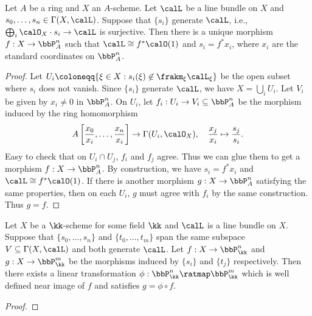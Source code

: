     \begin{theorem}\label{thm:morphism_to_projective_space}
        Let \(A\) be a ring and \(X\) an \(A\)-scheme.
        Let \(\calL\) be a line bundle on \(X\) and \(s_0,\ldots,s_n\in\Gamma(X,\calL)\).
        Suppose that \(\{s_i\}\) generate \(\calL\), i.e., \(\bigoplus_i \calO_X\cdot s_i \to \calL\) is surjective.
        Then there is a unique morphism \(f:X\to \bbP^n_A\) such that \(\calL\cong f^*\calO(1)\) and \(s_i=f^*x_i\), where \(x_i\) are the standard coordinates on \(\bbP^n_A\). 
    \end{theorem}
    \begin{proof}
        Let \(U_i\coloneqq \{\xi \in X: s_i(\xi) \not\in \frakm_\xi \calL_\xi\}\) be the open subset where \(s_i\) does not vanish.
        Since \(\{s_i\}\) generate \(\calL\), we have \(X=\bigcup_i U_i\).
        Let \(V_i\) be given by \(x_i \neq 0\) in \(\bbP^n_A\).
        On \(U_i\), let \(f_i:U_i\to V_i \subseteq \bbP^n_A\) be the morphism induced by the ring homomorphism
        \[ A\left[\frac{x_0}{x_i},\ldots,\frac{x_n}{x_i}\right] \to \Gamma(U_i,\calO_X), \quad \frac{x_j}{x_i} \mapsto \frac{s_j}{s_i}. \]
        Easy to check that on \(U_i\cap U_j\), \(f_i\) and \(f_j\) agree.
        Thus we can glue them to get a morphism \(f:X\to \bbP^n_A\).
        By construction, we have \(s_i=f^*x_i\) and \(\calL\cong f^*\calO(1)\).
        If there is another morphism \(g:X\to \bbP^n_A\) satisfying the same properties, then on each \(U_i\), \(g\) must agree with \(f_i\) by the same construction.
        Thus \(g=f\).
    \end{proof}

    \begin{proposition}\label{prop:different_choices_of_sections_give_different_morphisms_which_differ_by_a_linear_transformation}
        Let \(X\) be a \(\kk\)-scheme for some field \(\kk\) and \(\calL\) is a line bundle on \(X\).
        Suppose that \(\{s_0,\ldots,s_n\}\) and \(\{t_0,\ldots,t_m\}\) span the same subspace \(V\subseteq \Gamma(X,\calL)\) and both generate \(\calL\).
        Let \(f:X\to \bbP^n_\kk\) and \(g:X\to \bbP^m_\kk\) be the morphisms induced by \(\{s_i\}\) and \(\{t_j\}\) respectively.
        Then there exists a linear transformation \(\phi:\bbP^n_\kk \ratmap \bbP^m_\kk\) which is well defined near image of \(f\) and satisfies \(g=\phi \circ f\).
    \end{proposition}
    \begin{proof}
    \end{proof}

